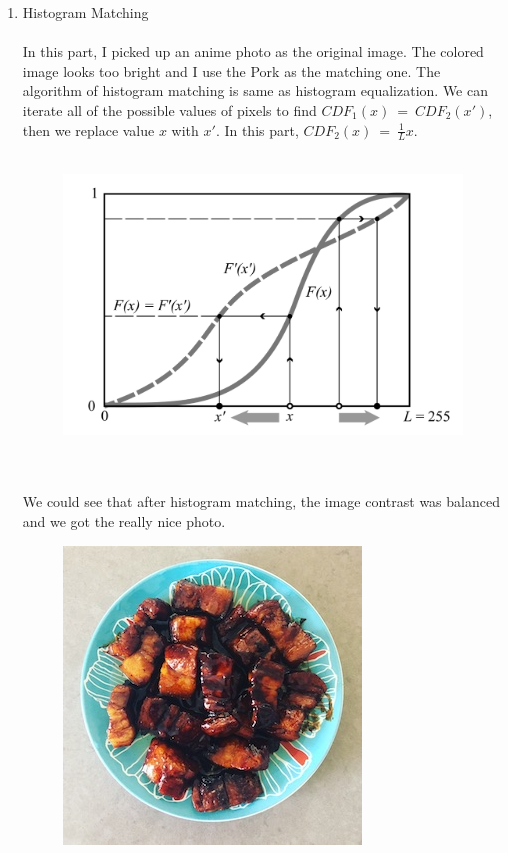 \documentclass{article}
\begin{document}
\begin{enumerate}[label=B\arabic*)]
	\pagebreak
	\item Histogram Matching
		\\
		\\
		In this part, I picked up an anime photo as the original image. The colored image looks too bright and I use the Pork as the matching one. The algorithm of histogram matching is same as histogram equalization. We can iterate all of the possible values of pixels to find $CDF_1(x)\:=\:CDF_2(x')$, then we replace value $x$ with $x'$. In this part, $CDF_2(x)\:=\:\frac{1}{L}x$.
		\\
		\\
		\begin{figure}[h!]
			\centering
			\includegraphics[width=0.68\linewidth]{img-7.png}
		\end{figure}
		\\
		\\
		We could see that after histogram matching, the image contrast was balanced and we got the really nice photo.
		\begin{figure}[h!]
			\begin{minipage}{0.48\textwidth}
				\centering
				\includegraphics[width=0.6\linewidth]{Pork/Original.jpg}

\end{minipage}
\end{figure}
\end{enumerate}
\end{document}
